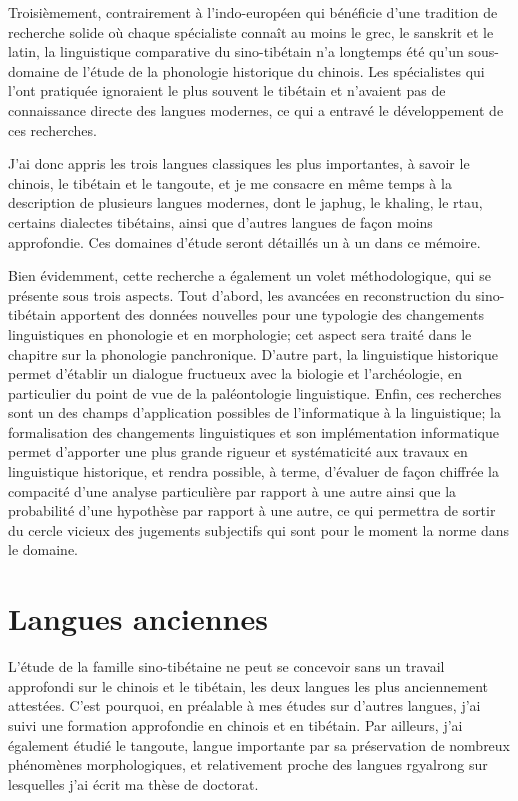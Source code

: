 \documentclass[oldfontcommands,oneside,a4paper,11pt]{memoir}
\begin{document}
Troisièmement, contrairement à l'indo-européen qui bénéficie d'une tradition de recherche solide où chaque spécialiste connaît au moins le grec, le sanskrit et le latin, la linguistique comparative du sino-tibétain n'a longtemps été qu'un sous-domaine de l'étude de la phonologie historique du chinois. Les spécialistes qui l'ont pratiquée ignoraient le plus souvent le tibétain et n'avaient pas de connaissance directe des langues modernes, ce qui a entravé le développement de ces recherches.

J'ai donc appris les trois langues classiques les plus importantes, à savoir le chinois, le tibétain et le tangoute, et je me consacre en même temps à la description de plusieurs langues modernes, dont le japhug, le khaling, le rtau, certains dialectes tibétains, ainsi que d'autres langues de façon moins approfondie. Ces domaines d'étude  seront détaillés un à un dans ce mémoire.

Bien évidemment, cette recherche a également un volet méthodologique, qui se présente sous trois aspects. Tout d'abord, les avancées en reconstruction du sino-tibétain apportent des données nouvelles pour une typologie des changements linguistiques en phonologie et en morphologie; cet aspect sera traité dans le chapitre sur la phonologie panchronique. D'autre part, la linguistique historique permet d'établir un dialogue fructueux avec la biologie et l'archéologie, en particulier du point de vue de la paléontologie linguistique. Enfin, ces recherches sont un des champs d'application possibles de l'informatique à la linguistique; la formalisation des changements linguistiques et son implémentation informatique permet d'apporter une plus grande rigueur et systématicité  aux travaux en linguistique historique, et rendra possible, à terme, d'évaluer de façon chiffrée la compacité d'une analyse particulière par rapport à une autre ainsi que la probabilité d'une hypothèse par rapport à une autre, ce qui permettra de sortir du cercle vicieux des jugements subjectifs qui sont pour le moment la norme dans le domaine.


\chapter{Langues anciennes}
L’étude de la famille sino-tibétaine ne peut se concevoir sans un travail approfondi sur le chinois et le tibétain, les deux langues les plus anciennement attestées. C’est pourquoi, en préalable à mes études sur d’autres langues, j’ai suivi une formation approfondie en chinois et en tibétain.  Par ailleurs, j'ai également étudié le tangoute, langue importante par sa préservation de nombreux phénomènes morphologiques, et relativement proche des langues rgyalrong sur lesquelles j'ai écrit ma thèse de doctorat.
\end{document}
